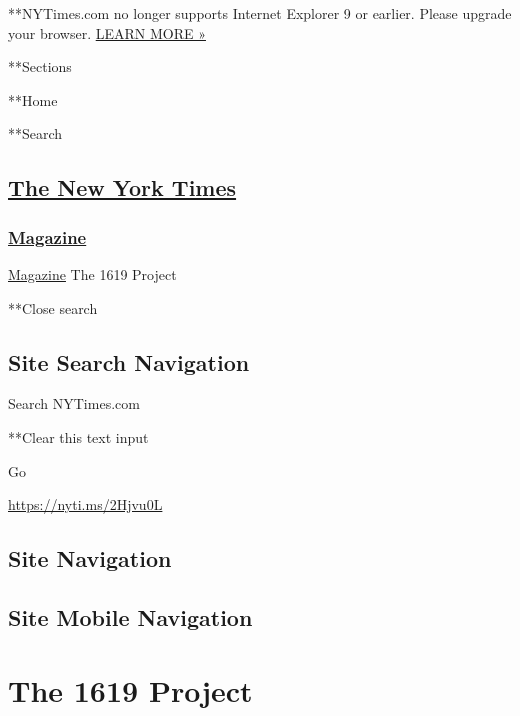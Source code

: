  **NYTimes.com no longer supports Internet Explorer 9 or earlier. Please
upgrade your browser.
\href{http://www.nytimes3xbfgragh.onion/content/help/site/ie9-support.html}{LEARN
MORE »}

**Sections

**Home

**Search

\hypertarget{the-new-york-times}{%
\subsection{\texorpdfstring{\href{http://www.nytimes3xbfgragh.onion/}{The
New York Times}}{The New York Times}}\label{the-new-york-times}}

\hypertarget{-magazine-}{%
\subsubsection{\texorpdfstring{
\href{https://www.nytimes3xbfgragh.onion/section/magazine}{Magazine}
}{ Magazine }}\label{-magazine-}}

 \href{https://www.nytimes3xbfgragh.onion/section/magazine}{Magazine}
\textbar{}The 1619 Project

**Close search

\hypertarget{site-search-navigation}{%
\subsection{Site Search Navigation}\label{site-search-navigation}}

Search NYTimes.com

**Clear this text input

Go

\url{https://nyti.ms/2Hjvu0L}

\hypertarget{site-navigation}{%
\subsection{Site Navigation}\label{site-navigation}}

\hypertarget{site-mobile-navigation}{%
\subsection{Site Mobile Navigation}\label{site-mobile-navigation}}

\hypertarget{the-1619-project}{%
\section{The 1619 Project}\label{the-1619-project}}

